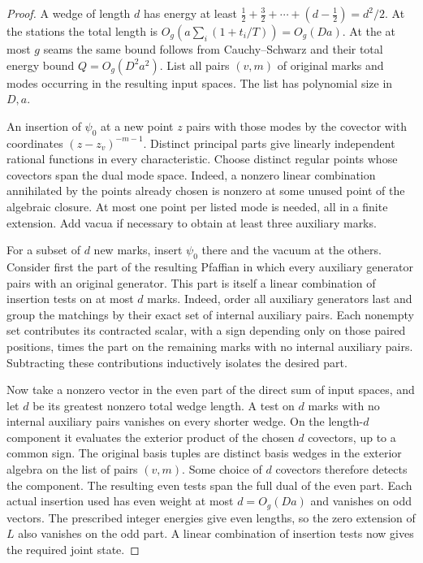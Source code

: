 \begin{proof}
A wedge of length $d$ has energy at least
$\tfrac12+\tfrac32+\cdots+(d-\tfrac12)=d^2/2$. At the stations the
total length is $O_g(a\sum_i(1+t_i/T))=O_g(Da)$. At the at most $g$
seams the same bound follows from Cauchy--Schwarz and their total
energy bound $Q=O_g(D^2a^2)$. List all pairs $(v,m)$ of original
marks and modes occurring in the resulting input spaces. The list
has polynomial size in $D,a$.

An insertion of $\psi_0$ at a new point $z$ pairs with those modes by
the covector with coordinates $(z-z_v)^{-m-1}$. Distinct principal
parts give linearly independent rational functions in every
characteristic. Choose distinct regular points whose covectors span
the dual mode space. Indeed, a nonzero linear combination annihilated
by the points already chosen is nonzero at some unused point of the
algebraic closure. At most one point per listed mode is needed, all
in a finite extension. Add vacua if necessary to obtain at least
three auxiliary marks.

For a subset of $d$ new marks, insert $\psi_0$ there and the vacuum
at the others. Consider first the part of the resulting Pfaffian
in which every auxiliary generator pairs with an original generator.
This part is itself a linear combination of insertion tests on at
most $d$ marks. Indeed, order all auxiliary generators last and group
the matchings by their exact set of internal auxiliary pairs. Each
nonempty set contributes its contracted scalar, with a sign depending
only on those paired positions, times the part on the remaining marks
with no internal auxiliary pairs. Subtracting these contributions
inductively isolates the desired part.

Now take a nonzero vector in the even part of the direct sum of input
spaces, and let $d$ be its greatest nonzero total wedge length. A test
on $d$ marks with no internal auxiliary pairs vanishes on every shorter
wedge. On the length-$d$ component it evaluates the exterior product of
the chosen $d$ covectors, up to a common sign. The original basis
tuples are distinct basis wedges in the exterior algebra on the list
of pairs $(v,m)$. Some choice of $d$ covectors therefore detects the
component. The resulting even tests span the full dual of the even
part. Each actual insertion used has even weight at most $d=O_g(Da)$
and vanishes on odd vectors. The prescribed integer energies give
even lengths, so the zero extension of $L$ also vanishes on the odd
part. A linear combination of insertion tests now gives the required
joint state.
\end{proof}

